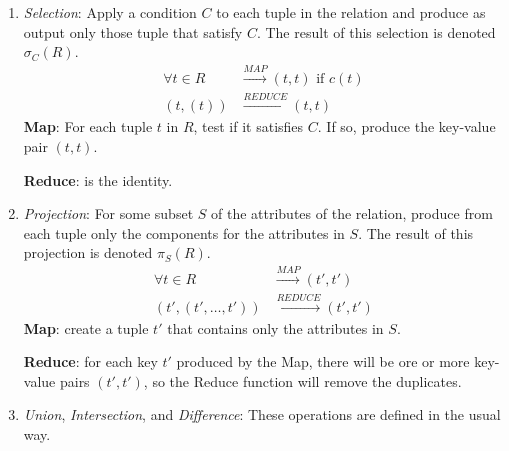 \begin{enumerate}
    \setlength\itemsep{1em}

    \item \textit{Selection}: Apply a condition $C$ to each tuple in the relation and produce as output only those tuple that satisfy $C$. The result of this selection is denoted $\sigma_C(R)$.
    \begin{equation*}
        \begin{split}
        \forall t\in R  & \xrightarrow{MAP} (t,t) \text{ if } c(t) \\
               (t, (t)) & \xrightarrow{REDUCE} (t,t) 
        \end{split}
    \end{equation*}
    \textbf{Map}: For each tuple $t$ in $R$, test if it satisfies $C$. If so, produce the key-value pair $(t, t)$.

    \textbf{Reduce}: is the identity.

    \item \textit{Projection}: For some subset $S$ of the attributes of the relation, produce from each tuple only the components for the attributes in $S$. The result of this projection is denoted $\pi_S(R)$. 
    \begin{equation*}
        \begin{split}
                  \forall t\in R & \xrightarrow{MAP} (t',t') \\
            (t', (t',\dots, t')) &\xrightarrow{REDUCE} (t',t')
        \end{split}
    \end{equation*}
    \textbf{Map}: create a tuple $t'$ that contains only the attributes in $S$.

    \textbf{Reduce}: for each key $t'$ produced by the Map, there will be ore or more key-value pairs $(t', t')$, so the Reduce function will remove the duplicates.
    
    \item \textit{Union}, \textit{Intersection}, and \textit{Difference}: These operations are defined in the usual way.  
    

\end{enumerate}
